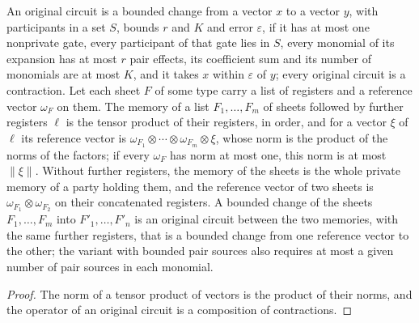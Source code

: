 \begin{definition}
    \label{def:lattice_bounded_change}
    \leanok
    An original circuit is a bounded change from a vector $x$ to a vector $y$, with
    participants in a set $S$, bounds $r$ and $K$ and error $\varepsilon$, if it has
    at most one nonprivate gate, every participant of that gate lies in $S$, every
    monomial of its expansion has at most $r$ pair effects, its coefficient sum and
    its number of monomials are at most $K$, and it takes $x$ within $\varepsilon$ of
    $y$; every original circuit is a contraction. Let each sheet $F$ of some type
    carry a list of registers and a reference vector $\omega_F$ on them. The memory
    of a list $F_1,\dots,F_m$ of sheets followed by further registers $\ell$ is the
    tensor product of their registers, in order, and for a vector $\xi$ of $\ell$
    its reference vector is $\omega_{F_1}\otimes\cdots\otimes\omega_{F_m}\otimes\xi$,
    whose norm is the product of the norms of the factors; if every $\omega_F$ has
    norm at most one, this norm is at most $\lVert\xi\rVert$. Without further
    registers, the memory of the sheets is the whole private memory of a party
    holding them, and the reference vector of two sheets is
    $\omega_{F_1}\otimes\omega_{F_2}$ on their concatenated registers. A bounded
    change of the sheets $F_1,\dots,F_m$ into $F'_1,\dots,F'_n$ is an original
    circuit between the two memories, with the same further registers, that is a
    bounded change from one reference vector to the other; the variant with bounded
    pair sources also requires at most a given number of pair sources in each
    monomial.
\end{definition}

\begin{proof}\leanok
    The norm of a tensor product of vectors is the product of their norms, and the
    operator of an original circuit is a composition of contractions.
\end{proof}

